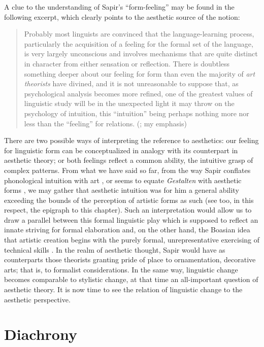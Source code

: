 \documentclass[output=paper]{langscibook}
\begin{document}
A clue to the understanding of Sapir's ``form-feeling'' may be found in the following excerpt, which clearly points to the aesthetic source of the notion:

\begin{quotation}
Probably most linguists are convinced that the language-learning process, particularly the acquisition of a feeling for the formal set of the language, is very largely unconscious and involves mechanisms that are quite distinct in character from either sensation or reflection. There is doubtless something deeper about our feeling for form than even the majority of \emph{art theorists} have divined, and it is not unreasonable to suppose that, as psychological analysis becomes more refined, one of the greatest values of linguistic study will be in the unexpected light it may throw on the psychology of intuition, this ``intuition'' being perhaps nothing more nor less than the ``feeling'' for relations. (\citealt[156]{Sapir1924}; my emphasis)
\end{quotation}

There are two possible ways of interpreting the reference to aesthetics: our feeling for linguistic form can be conceptualized in analogy with its counterpart in aesthetic theory; or both feelings reflect a common ability, the intuitive grasp of complex patterns. From what we have said so far, from the way Sapir conflates phonological intuition with art \citep[34]{Sapir1925}, or seems to equate \emph{Gestalten} with aesthetic forms \citep[145--150]{Sapir2002}, we may gather that aesthetic intuition was for him a general ability exceeding the bounds of the perception of artistic forms as such (see too, in this respect, the epigraph to this chapter). Such an interpretation would allow us to draw a parallel between this formal linguistic play which is supposed to reflect an innate striving for formal elaboration and, on the other hand, the Boasian idea that artistic creation begins with the purely formal, unrepresentative exercising of technical skills \citep{Boas1927}. In the realm of aesthetic thought, Sapir would have as counterparts those theorists granting pride of place to ornamentation, decorative arts; that is, to formalist considerations. In the same way, linguistic change becomes comparable to stylistic change, at that time an all-important question of aesthetic theory. It is now time to see the relation of linguistic change to the aesthetic perspective.

\section{Diachrony}
\label{sec:fortis:diachrony}
\end{document}
